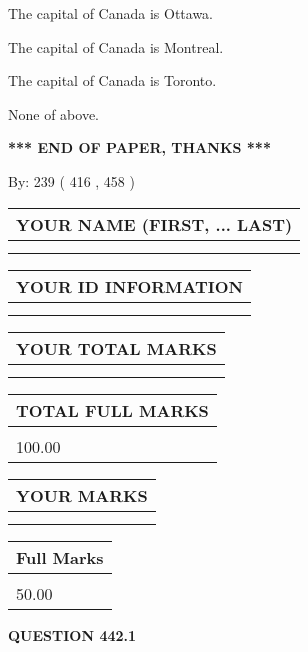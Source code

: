\documentclass[12pt]{article}
\begin{document}
  
 
 
The capital of Canada is Ottawa.
 
 
The capital of Canada is Montreal.
 
 
The capital of Canada is Toronto.
 
 
 None of above.
 
 
   
   
\vspace{1.0in} 
{\textbf{\large{ *** END OF PAPER, THANKS *** }}} 
   
   
\hspace{1.0in} By: 
 239 ( 416 ,  458 )
   
   
   
   
\newpage 
\setcounter{page}{ 
   442001 } 
   
   
   
   
\noindent\begin{tabular}{|l|}
\hline
YOUR NAME (FIRST, ... LAST)  \\
\hline
 \\ 
 \\ 
\hline
\end{tabular}
\hspace{0.05in} \begin{tabular}{|l|}
\hline
 YOUR   ID   INFORMATION  \\
\hline
 \\ 
 \\ 
\hline
\end{tabular}
   
   
\vspace{0.2in}\noindent\begin{tabular}{|l|}
\hline
YOUR TOTAL MARKS  \\
\hline
 \\ 
 \\ 
\hline
\end{tabular}
\hspace{0.05in} \begin{tabular}{|l|}
\hline
TOTAL FULL MARKS  \\
\hline
 \\ 
100.00 \\
\hline
\end{tabular}
  
\vspace{0.2in}
  
\noindent\begin{tabular}{|l|}
\hline
 YOUR MARKS  \\
\hline
 \\ 
 \\ 
\hline
\end{tabular}
\hspace{0.05in} \begin{tabular}{|l|}
\hline
 Full Marks  \\
\hline
 \\ 
50.00 \\
\hline
\end{tabular}
{\textbf{\Large{QUESTION
442.1 
}}}
  
\end{document}

